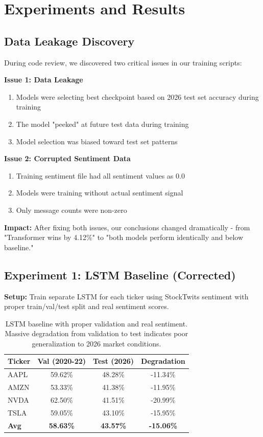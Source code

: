 \documentclass[10pt,twocolumn]{article}
\begin{document}
\section{Experiments and Results}

\subsection{Data Leakage Discovery}

During code review, we discovered two critical issues in our training scripts:

\textbf{Issue 1: Data Leakage}
\begin{enumerate}
\item Models were selecting best checkpoint based on 2026 test set accuracy during training
\item The model "peeked" at future test data during training
\item Model selection was biased toward test set patterns
\end{enumerate}

\textbf{Issue 2: Corrupted Sentiment Data}
\begin{enumerate}
\item Training sentiment file had all sentiment values as 0.0
\item Models were training without actual sentiment signal
\item Only message counts were non-zero
\end{enumerate}

\textbf{Impact:} After fixing both issues, our conclusions changed dramatically - from "Transformer wins by 4.12\%" to "both models perform identically and below baseline."

\subsection{Experiment 1: LSTM Baseline (Corrected)}

\textbf{Setup:} Train separate LSTM for each ticker using StockTwits sentiment with proper train/val/test split and real sentiment scores.

\begin{table}[h]
\centering
\small
\begin{tabular}{lccc}
\toprule
Ticker & Val (2020-22) & Test (2026) & Degradation \\
\midrule
AAPL & 59.62\% & 48.28\% & -11.34\% \\
AMZN & 53.33\% & 41.38\% & -11.95\% \\
NVDA & 62.50\% & 41.51\% & -20.99\% \\
TSLA & 59.05\% & 43.10\% & -15.95\% \\
\textbf{Avg} & \textbf{58.63\%} & \textbf{43.57\%} & \textbf{-15.06\%} \\
\bottomrule
\end{tabular}
\caption{LSTM baseline with proper validation and real sentiment. Massive degradation from validation to test indicates poor generalization to 2026 market conditions.}
\end{table}
\end{document}
